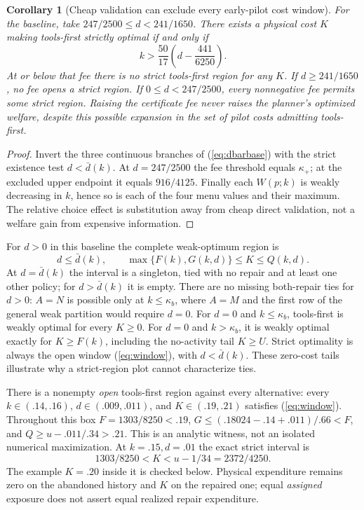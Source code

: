 \documentclass[11pt]{article}
\newtheorem{corollary}{Corollary}
\begin{document}
\begin{corollary}[Cheap validation can exclude every early-pilot cost window]
For the baseline, take $247/2500\leq d<241/1650$. There exists a physical cost $K$ making tools-first strictly optimal if and only if
\[
 k>\frac{50}{17}\left(d-\frac{441}{6250}\right).
\]
At or below that fee there is no strict tools-first region for any $K$. If $d\geq241/1650$, no fee opens a strict region. If $0\leq d<247/2500$, every nonnegative fee permits some strict region. Raising the certificate fee never raises the planner's optimized welfare, despite this possible expansion in the set of pilot costs admitting tools-first.
\end{corollary}
\begin{proof}
Invert the three continuous branches of (\ref{eq:dbarbase}) with the strict existence test $d<\bar d(k)$. At $d=247/2500$ the fee threshold equals $\kappa_+$; at the excluded upper endpoint it equals $916/4125$. Finally each $W(p;k)$ is weakly decreasing in $k$, hence so is each of the four menu values and their maximum. The relative choice effect is substitution away from cheap direct validation, not a welfare gain from expensive information.
\end{proof}

For $d>0$ in this baseline the complete weak-optimum region is
\[
 d\leq\bar d(k),\qquad \max\{F(k),G(k,d)\}\leq K\leq Q(k,d).
\]
At $d=\bar d(k)$ the interval is a singleton, tied with no repair and at least one other policy; for $d>\bar d(k)$ it is empty. There are no missing both-repair ties for $d>0$: $A=N$ is possible only at $k\leq\kappa_b$, where $A=M$ and the first row of the general weak partition would require $d=0$. For $d=0$ and $k\leq\kappa_b$, tools-first is weakly optimal for every $K\geq0$. For $d=0$ and $k>\kappa_b$, it is weakly optimal exactly for $K\geq F(k)$, including the no-activity tail $K\geq U$. Strict optimality is always the open window (\ref{eq:window}), with $d<\bar d(k)$. These zero-cost tails illustrate why a strict-region plot cannot characterize ties.

There is a nonempty \emph{open} tools-first region against every alternative: every $k\in(.14,.16)$, $d\in(.009,.011)$, and $K\in(.19,.21)$ satisfies (\ref{eq:window}). Throughout this box $F=1303/8250<.19$, $G\leq(.18024-.14+.011)/.66< F$, and $Q\geq u-.011/.34>.21$. This is an analytic witness, not an isolated numerical maximization. At $k=.15,d=.01$ the exact strict interval is
\[
 1303/8250<K< u-1/34=2372/4250.
\]
The example $K=.20$ inside it is checked below. Physical expenditure remains zero on the abandoned history and $K$ on the repaired one; equal \emph{assigned} exposure does not assert equal realized repair expenditure.
\end{document}
